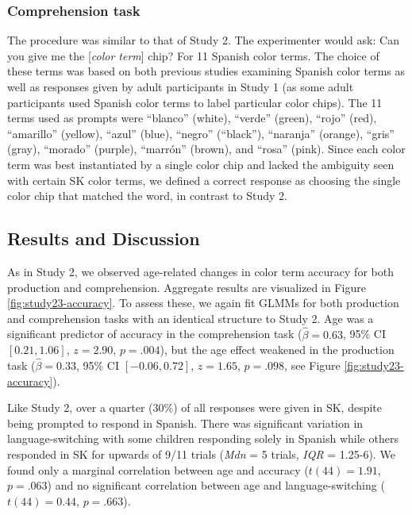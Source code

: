 \documentclass[
  english,
  ,apa7,floatsintext]{apa6}
\begin{document}
\hypertarget{comprehension-task-1}{%
\subsubsection{Comprehension task}\label{comprehension-task-1}}

The procedure was similar to that of Study 2. The experimenter would ask: Can you give me the {[}\emph{color term}{]} chip? For 11 Spanish color terms. The choice of these terms was based on both previous studies examining Spanish color terms as well as responses given by adult participants in Study 1 (as some adult participants used Spanish color terms to label particular color chips). The 11 terms used as prompts were ``blanco'' (white), ``verde'' (green), ``rojo'' (red), ``amarillo'' (yellow), ``azul'' (blue), ``negro'' (``black''), ``naranja'' (orange), ``gris'' (gray), ``morado'' (purple), ``marrón'' (brown), and ``rosa'' (pink). Since each color term was best instantiated by a single color chip and lacked the ambiguity seen with certain SK color terms, we defined a correct response as choosing the single color chip that matched the word, in contrast to Study 2.

\hypertarget{results-and-discussion-2}{%
\subsection{Results and Discussion}\label{results-and-discussion-2}}

As in Study 2, we observed age-related changes in color term accuracy for both production and comprehension. Aggregate results are visualized in Figure \ref{fig:study23-accuracy}. To assess these, we again fit GLMMs for both production and comprehension tasks with an identical structure to Study 2. Age was a significant predictor of accuracy in the comprehension task (\(\hat{\beta} = 0.63\), 95\% CI \([0.21, 1.06]\), \(z = 2.90\), \(p = .004\)), but the age effect weakened in the production task (\(\hat{\beta} = 0.33\), 95\% CI \([-0.06, 0.72]\), \(z = 1.65\), \(p = .098\), see Figure \ref{fig:study23-accuracy}).

Like Study 2, over a quarter (30\%) of all responses were given in SK, despite being prompted to respond in Spanish. There was significant variation in language-switching with some children responding solely in Spanish while others responded in SK for upwards of 9/11 trials (\emph{Mdn} = 5 trials, \emph{IQR} = 1.25-6). We found only a marginal correlation between age and accuracy (\(t(44) = 1.91\), \(p = .063\)) and no significant correlation between age and language-switching (\(t(44) = 0.44\), \(p = .663\)).
\end{document}
